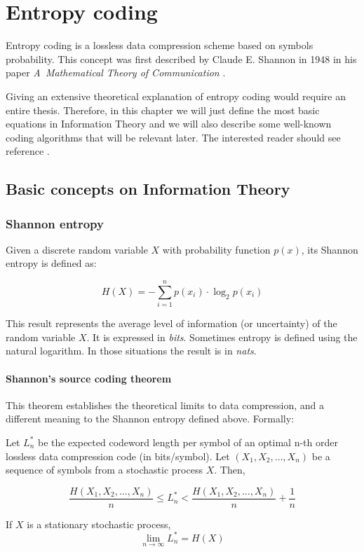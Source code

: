 \chapter{Entropy coding} \label{ch:entropy_coding}
Entropy coding is a lossless data compression scheme based on symbols probability. This concept was first described by Claude E. Shannon in 1948 in his paper \textit{A~Mathematical Theory of Communication} \parencite{Shannon1948}.

Giving an extensive theoretical explanation of entropy coding would require an entire thesis. Therefore, in this chapter we will just define the most basic equations in Information Theory and we will also describe some well-known coding algorithms that will be relevant later. The interested reader should see reference \parencite{cover}.

\section{Basic concepts on Information Theory}
\subsection{Shannon entropy}
Given a discrete random variable $X$ with probability function $p(x)$, its Shannon entropy is defined as:

\begin{equation}
H(X) = - \sum_{i=1}^{n} p(x_i) \cdot \log_2 p(x_i) 
\end{equation}

This result represents the average level of information (or uncertainty) of the random variable $X$. It is expressed in \textit{bits}. Sometimes entropy is defined using the natural logarithm. In those situations the result is in \textit{nats}.

\subsubsection{Shannon's source coding theorem}
This theorem establishes the theoretical limits to data compression, and a different meaning to the Shannon entropy defined above. Formally:

\begin{theorem}
Let $L_n^*$ be the expected codeword length per symbol of an optimal n-th order lossless data compression code (in bits/symbol). Let $(X_1, X_2, \dots, X_n )$ be a sequence of symbols from a stochastic process $X$. Then,

\begin{equation}
	\frac{H(X_1, X_2, \dots, X_n )}{n} \leq L_n^* < \frac{H(X_1, X_2, \dots, X_n )}{n} + \frac{1}{n}
\end{equation}

If $X$ is a stationary stochastic process,
\begin{equation}
	\lim_{n \to \infty} L_n^* = H(X)
\end{equation}
\end{theorem}


